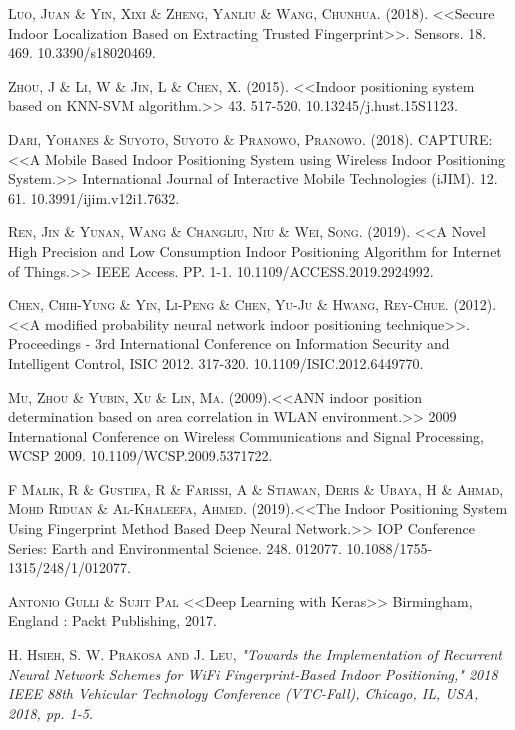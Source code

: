 \documentclass[12pt]{report}
\begin{document}
\begin{thebibliography}{X}
 \textsc{Luo, Juan \& Yin, Xixi \& Zheng, Yanliu \& Wang, Chunhua.} (2018). <<Secure Indoor Localization Based on Extracting Trusted Fingerprint>>. Sensors. 18. 469. 10.3390/s18020469.

 \textsc{Zhou, J \& Li, W \& Jin, L \& Chen, X.} (2015). <<Indoor positioning system based on KNN-SVM algorithm.>> 43. 517-520. 10.13245/j.hust.15S1123.

\textsc{Dari, Yohanes \& Suyoto, Suyoto \& Pranowo, Pranowo.} (2018). CAPTURE: <<A Mobile Based Indoor Positioning System using Wireless Indoor Positioning System.>> International Journal of Interactive Mobile Technologies (iJIM). 12. 61. 10.3991/ijim.v12i1.7632. 

 \textsc{Ren, Jin \& Yunan, Wang \& Changliu, Niu \& Wei, Song}. (2019). <<A Novel High Precision and Low Consumption Indoor Positioning Algorithm for Internet of Things.>> IEEE Access. PP. 1-1. 10.1109/ACCESS.2019.2924992.

\textsc{Chen, Chih-Yung \& Yin, Li-Peng \& Chen, Yu-Ju \& Hwang, Rey-Chue}. (2012). <<A modified probability neural network indoor positioning technique>>. Proceedings - 3rd International Conference on Information Security and Intelligent Control, ISIC 2012. 317-320. 10.1109/ISIC.2012.6449770.

 \textsc{Mu, Zhou \& Yubin, Xu \& Lin, Ma}. (2009).<<ANN indoor position determination based on area correlation in WLAN environment.>> 2009 International Conference on Wireless Communications and Signal Processing, WCSP 2009. 10.1109/WCSP.2009.5371722. 

 \textsc{F Malik, R \& Gustifa, R \& Farissi, A \& Stiawan, Deris \& Ubaya, H \& Ahmad, Mohd Riduan \& Al-Khaleefa, Ahmed. (2019)}.<<The Indoor Positioning System Using Fingerprint Method Based Deep Neural Network.>> IOP Conference Series: Earth and Environmental Science. 248. 012077. 10.1088/1755-1315/248/1/012077. 

 \textsc{Antonio Gulli \& Sujit Pal}
<<Deep Learning with Keras>> Birmingham, England : Packt Publishing, 2017. 

\textsc{H. Hsieh, S. W. Prakosa and J. Leu}, \textit{"Towards the Implementation of Recurrent Neural Network Schemes for WiFi Fingerprint-Based Indoor Positioning," 2018 IEEE 88th Vehicular Technology Conference (VTC-Fall), Chicago, IL, USA, 2018, pp. 1-5.}

\end{thebibliography}

	\appendix
%	

    \printglossaries
\end{document}
